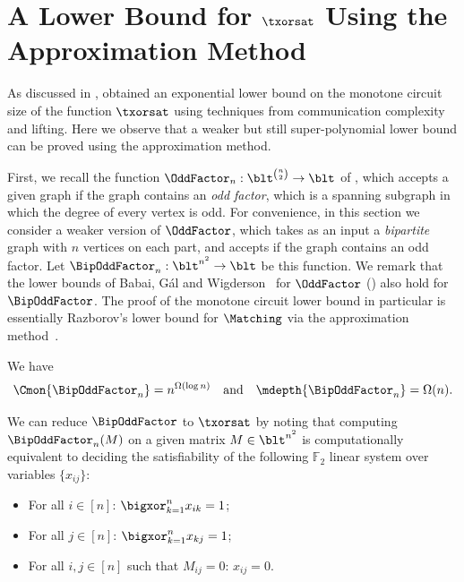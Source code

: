 \documentclass[11pt]{article}
\begin{document}
	



\normalsize

\appendix

\section{A Lower Bound for $\txorsat$ Using the Approximation Method}
\label{sec:xorsat-appr}

As discussed in ,
\citep{gkrs19}
obtained an exponential lower bound on the monotone
circuit size of the function $\txorsat$ using techniques from communication
complexity and lifting. Here we observe that a weaker but still
super-polynomial lower bound  can be proved using the approximation method.

First, we recall the
function $\OddFactor_n : \blt^{\binom{n}{2}} \to \blt$
of ,
which accepts 
a 
given graph
if the graph contains an \emph{odd factor},
which is a spanning subgraph in which the degree of every
vertex is odd.
For convenience,
in this section we consider a weaker version of $\OddFactor$, which takes as an input a
\emph{bipartite} graph with $n$ vertices on each part,
and accepts if the graph contains an odd factor.
Let $\BipOddFactor_n : \blt^{n^2} \to \blt$
be this function.
We remark that the lower bounds of
Babai, Gál and Wigderson~\cite{DBLP:journals/combinatorica/BabaiGW99}
for $\OddFactor$ ()
also hold for $\BipOddFactor$.
The proof of the monotone circuit lower bound in particular
is essentially Razborov's lower bound for $\Matching$ via the approximation method~\cite{razborov1985lower}.

\begin{theorem}
    \label{thm:oddfactor}
    We have
    $$\Cmon{\BipOddFactor_n} = n^{\Omega(\log n)}
    \quad \text{and} \quad 
    \mdepth{\BipOddFactor_n} = \Omega(n).$$
\end{theorem}


We can reduce 
$\BipOddFactor$
to $\txorsat$ by
noting that computing $\BipOddFactor_n(M)$ on a given matrix
$M \in \blt^{n^2}$ is computationally equivalent to deciding the satisfiability of the following $\mathbb{F}_2$ linear system over variables $\{x_{ij}\}$:
\begin{itemize}
    \item For all $i \in [n]$:
        $\bigxor_{k=1}^n x_{ik} = 1$;
    \item For all $j \in [n]$:
        $\bigxor_{k=1}^n x_{kj} = 1$;
    \item For all $i,j \in [n]$ such that $M_{ij} = 0$:
        $x_{ij} = 0$.
\end{itemize}
\end{document}
